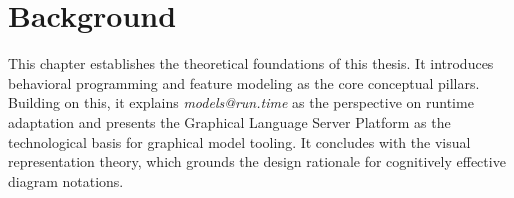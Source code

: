 \chapter{Background}
\label{chapter:background}

This chapter establishes the theoretical foundations of this thesis.
It introduces behavioral programming and feature modeling as the core conceptual pillars.
Building on this, it explains \textit{models@run.time} as the perspective on runtime adaptation and presents the Graphical Language Server Platform as the technological basis for graphical model tooling.
It concludes with the visual representation theory, which grounds the design rationale for cognitively effective diagram notations.

\glsresetall












